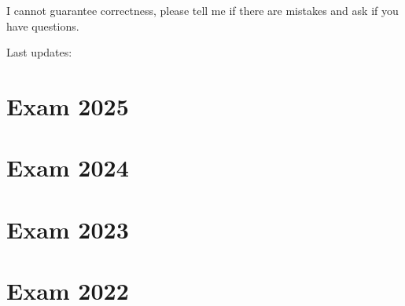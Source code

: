\documentclass[12pt]{article} %
\begin{document}

I cannot guarantee correctness, please tell me if there are mistakes and ask if you have questions.

Last updates: \DTMnow

\tableofcontents

\newpage
\section{Exam 2025}

\newpage


\newpage
\section{Exam 2024}

\newpage


\newpage
\section{Exam 2023}

\newpage


\newpage
\section{Exam 2022}

\newpage

\newpage

\newpage

\end{document}
